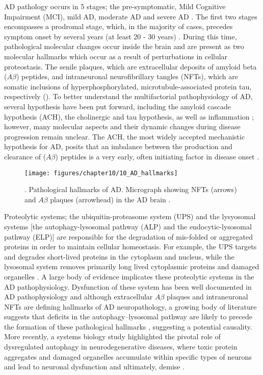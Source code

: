 AD pathology occurs in 5 stages; the pre-symptomatic, Mild Cognitive Impairment (MCI), mild AD, moderate AD and severe AD \citep{Caldwell2015}. The first two stages encompasses a prodromal stage, which, in the majority of cases, precedes symptom onset by several years (at least 20 - 30 years) \citep{Caldwell2015,Caselli2013,Penn1993}. During this time, pathological molecular changes occur inside the brain and are present as two molecular hallmarks which occur as a result of perturbations in cellular proteostasis. The senile plaques, which are extracellular deposits of amyloid beta ($A\beta$)
peptides, and intraneuronal neurofibrillary tangles (NFTs), which are somatic inclusions of hyperphosphorylated, microtubule-associated protein tau, respectively \citep{Mattson2008} (). To better understand the multifactorial pathophysiology of AD, several hypothesis have been put forward, including the amyloid cascade hypothesis (ACH), the cholinergic and tau hypothesis, as well as inflammation \citep{Kurz2011}; however, many molecular aspects and their dynamic changes during disease progression remain unclear. The ACH, the most widely accepted mechanistic hypothesis for AD, posits that an imbalance between the production and clearance of ($A\beta$) peptides is a very early, often initiating factor in disease onset \citep{Hardy2009,Hardy1992}.

\begin{figure}[!htbp]
  \texttt{[image: figures/chapter10/10\_AD\_hallmarks]}
  \caption[Pathological hallmarks of AD]{. Pathological hallmarks of AD. Micrograph showing NFTs (arrows) and $A\beta$ plaques (arrowhead) in the AD brain \citep{Nixon2007} .}
  \label{fig:10_AD_hallmarks}
\end{figure}

Proteolytic systems; the ubiquitin-proteasome system (UPS) and the lysyosomal systems [the autophagy-lysosomal pathway (ALP) and the endocytic-lysosomal pathway (ELP)] are responsible for the degradation of mis-folded or aggregated proteins in order to maintain cellular homeostasis. For example, the UPS targets and degrades short-lived proteins in the cytoplasm and nucleus, while the lysosomal system removes primarily long lived cytoplasmic proteins and damaged organelles \citep{Ravikumar2003,Rubinsztein2005}. A large body of evidence implicates these proteolytic systems in the AD pathophysiology. Dysfunction of these system has been well documented in AD pathophysiology and although extracellular $A\beta$ plaques and intraneuronal NFTs are defining hallmarks of AD neuropathology, a growing body of literature suggests that deficits in the autophagy–lysosomal pathway are likely to precede the formation of these pathological hallmarks \citep{Cataldo2000,Nixon2011,Perez2015,zare-shahabadi2015}, suggesting a potential causality. More recently, a systems biology study highlighted the pivotal role of dysregulated autophagy in neurodegenerative diseases, where toxic protein aggregates and damaged organelles accumulate within specific types of neurons and lead to neuronal dysfunction and ultimately, demise \citep{Caberlotto2014}.

